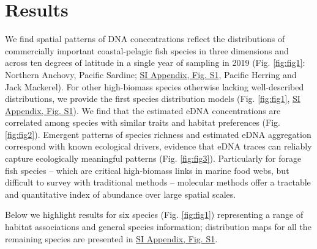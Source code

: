 \documentclass{article}
\begin{document}
\section{Results}
We find spatial patterns of DNA concentrations reflect the distributions of commercially important coastal-pelagic fish species in three dimensions and across ten degrees of latitude in a single year of sampling in 2019 (Fig. \ref{fig:fig1}: Northern Anchovy, Pacific Sardine; \href{SI_Appendix.pdf}{SI Appendix, Fig. S1}, Pacific Herring and Jack Mackerel). For other high-biomass species otherwise lacking well-described distributions, we provide the first species distribution models (Fig. \ref{fig:fig1}, \href{SI_Appendix.pdf}{SI Appendix, Fig. S1}). We find that the estimated eDNA concentrations are correlated among species with similar traits and habitat preferences (Fig. \ref{fig:fig2}). Emergent patterns of species richness and estimated eDNA aggregation correspond with known ecological drivers, evidence that eDNA traces can reliably capture ecologically meaningful patterns (Fig. \ref{fig:fig3}). Particularly for forage fish species – which are critical high-biomass links in marine food webs, but difficult to survey with traditional methods \cite{Pikitch2012} – molecular methods offer a tractable and quantitative index of abundance over large spatial scales.

Below we highlight results for six species (Fig. \ref{fig:fig1}) representing a range of habitat associations and general species information; distribution maps for all the remaining species are presented in \href{SI_Appendix.pdf}{SI Appendix, Fig. S1}.
\end{document}
